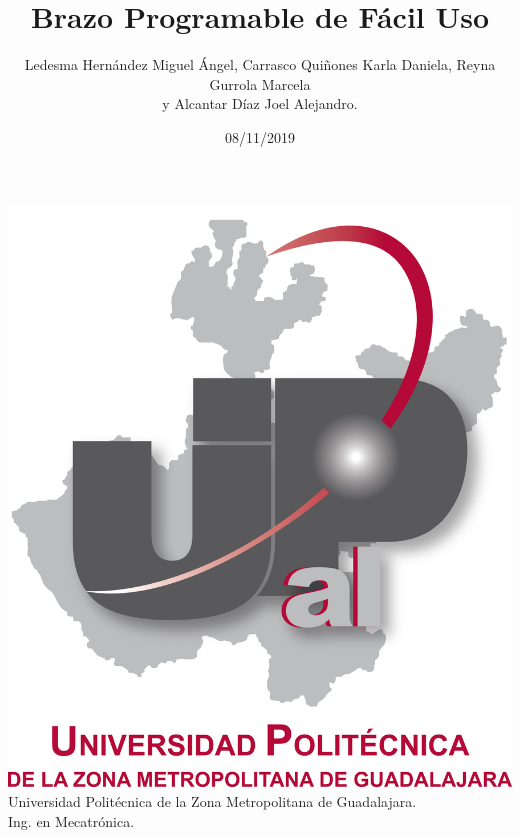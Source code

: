 \documentclass[letterpaper]{article}
\title{\textbf{Brazo Programable de Fácil Uso }}
\author{Ledesma Hernández Miguel Ángel, Carrasco Quiñones Karla Daniela, Reyna Gurrola Marcela\\ y Alcantar Díaz Joel Alejandro.}
\date{08/11/2019}
\begin{document}
\maketitle
\begin{center}
    \includegraphics[scale=0.5]{Img/UPZMGlog.png}\\
    \vspace{1cm}
    Universidad Politécnica de la Zona Metropolitana de Guadalajara.\\
    \vspace{1cm}
Ing. en Mecatrónica.
\end{center}\newpage
\end{document}
